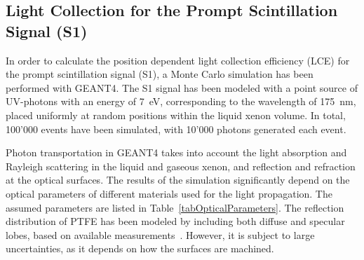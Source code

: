 \subsection{Light Collection for the Prompt Scintillation Signal (S1)}
\label{secLCEs1}

In order to calculate the position dependent light collection efficiency (LCE) for the prompt scintillation signal (S1), a Monte Carlo simulation has been performed with GEANT4. 
The S1 signal has been modeled with a point source of UV-photons with an energy of 7~eV, corresponding to the wavelength of 175~nm, placed uniformly at random positions within the liquid xenon volume. In total, 100'000 events have been simulated, with 10'000 photons generated each event.

Photon transportation in GEANT4 takes into account the light absorption and Rayleigh scattering in the liquid and gaseous xenon, and reflection and refraction at the optical surfaces. The results of the simulation significantly depend on the optical parameters of different materials used for the light propagation. The assumed parameters are listed in Table~\ref{tabOpticalParameters}. The reflection distribution of PTFE 
 has been modeled by including both diffuse and specular lobes, based on available measurements~\cite{TeflonReflection}. However, it is subject to large uncertainties, as it depends on how the surfaces are machined.


